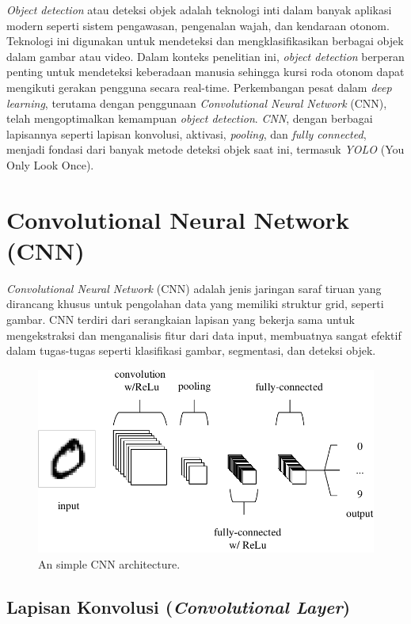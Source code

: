 \emph{Object detection} atau deteksi objek adalah teknologi inti dalam banyak aplikasi modern seperti sistem pengawasan, pengenalan wajah, dan kendaraan otonom. Teknologi ini digunakan untuk mendeteksi dan mengklasifikasikan berbagai objek dalam gambar atau video. Dalam konteks penelitian ini, \emph{object detection} berperan penting untuk mendeteksi keberadaan manusia sehingga kursi roda otonom dapat mengikuti gerakan pengguna secara real-time. Perkembangan pesat dalam \emph{deep learning}, terutama dengan penggunaan \emph{Convolutional Neural Network} (CNN), telah mengoptimalkan kemampuan \emph{object detection}. \emph{CNN}, dengan berbagai lapisannya seperti lapisan konvolusi, aktivasi, \emph{pooling}, dan \emph{fully connected}, menjadi fondasi dari banyak metode deteksi objek saat ini, termasuk \emph{YOLO} (You Only Look Once).

\section{Convolutional Neural Network (CNN)}
\label{sec:cnn}

\emph{Convolutional Neural Network} (CNN) adalah jenis jaringan saraf tiruan yang dirancang khusus untuk pengolahan data yang memiliki struktur grid, seperti gambar. CNN terdiri dari serangkaian lapisan yang bekerja sama untuk mengekstraksi dan menganalisis fitur dari data input, membuatnya sangat efektif dalam tugas-tugas seperti klasifikasi gambar, segmentasi, dan deteksi objek\cite{oshea2015cnn}.

\begin{figure}[H]
  \centering
  \includegraphics[width=.7\textwidth]{gambar/tex/simplecnn.pdf}
  \caption{An simple CNN architecture.}
  \label{fig:simplecnn}
\end{figure}

\subsection{Lapisan Konvolusi (\emph{Convolutional Layer})}
\label{subsec:Convolutional Layer}

